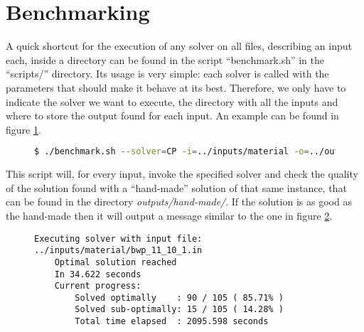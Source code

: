 \section{Benchmarking}
\label{sec:benchmarking}

A quick shortcut for the execution of any solver on all files, describing
an input each, inside a directory can be found in the script ``benchmark.sh''
in the ``scripts/'' directory. Its usage is very simple: each solver is
called with the parameters that should make it behave at its best. Therefore,
we only have to indicate the solver we want to execute, the directory with
all the inputs and where to store the output found for each input. An example
can be found in figure \ref{fig:benchmark-example}.

\begin{figure}[H]
\centering
\begin{lstlisting}[language=bash,basicstyle=\centering]
$ ./benchmark.sh --solver=CP -i=../inputs/material -o=../outputs/CP
\end{lstlisting}
\label{fig:benchmark-example}
\end{figure}

This script will, for every input, invoke the specified solver and check the
quality of the solution found with a ``hand-made'' solution of that same
instance, that can be found in the directory \textit{outputs/hand-made/}. If the
solution is as good as the hand-made then it will output a message
similar to the one in figure \ref{fig:benchmark-verbose:optimal}.

\begin{figure}[H]
\centering
\begin{BVerbatim}
Executing solver with input file: ../inputs/material/bwp_11_10_1.in
    Optimal solution reached
    In 34.622 seconds
    Current progress:
        Solved optimally    : 90 / 105 ( 85.71%
        Solved sub-optimally: 15 / 105 ( 14.28%
        Total time elapsed  : 2095.598 seconds
\end{BVerbatim}
\label{fig:benchmark-verbose:optimal}
\end{figure}

